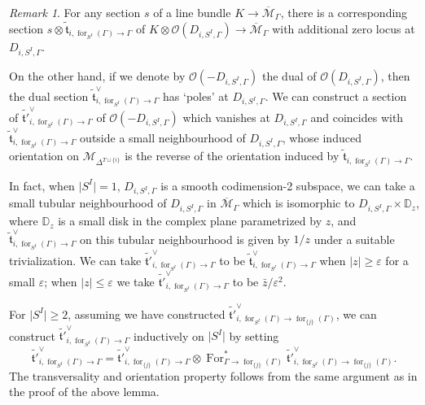 \documentclass[11pt]{amsart}
\theoremstyle{definition}
\theoremstyle{remark}
\newtheorem{rmk}[dummy]{Remark}
\renewcommand{\for}{\operatorname{for}}
\newcommand{\For}{\operatorname{For}}
\newcommand{\<}{\left<}
\renewcommand{\>}{\right>}
\numberwithin{equation}{section}
\def\Mbar{{\overline{\mathcal M}}}
\begin{document}
\begin{rmk}\label{rmk divosr like section}
    For any section $s$ of a line bundle $K\to \Mbar_{\Gamma}$, there is a corresponding section $s \otimes \tilde{\mathfrak t }_{i,\for_{S^I}(\Gamma)\to\Gamma}$ of $K\otimes \mathcal O(D_{i,S^I,\Gamma})\to \Mbar_{\Gamma}$ with additional zero locus at $D_{i,S^I,\Gamma}$.

    On the other hand, if we denote by $\mathcal O(-D_{i,S^I,\Gamma})$ the dual of $\mathcal O(D_{i,S^I,\Gamma})$, then the dual section $\tilde{\mathfrak t }_{i,\for_{S^I}(\Gamma)\to\Gamma}^\vee$ has `poles' at $D_{i,S^I,\Gamma}$. We can construct a section of $\tilde{\mathfrak t' }_{i,\for_{S^I}(\Gamma)\to\Gamma}^\vee$ of $\mathcal O(-D_{i,S^I,\Gamma})$ which vanishes at $D_{i,S^I,\Gamma}$ and coincides with $\tilde{\mathfrak t }_{i,\for_{S^I}(\Gamma)\to\Gamma}^\vee$ outside a small neighbourhood of $D_{i,S^I,\Gamma}$, whose induced orientation on $\mathcal M_{\Delta^{T\sqcup\{i\}}}$ is the reverse of the orientation induced by $\tilde{\mathfrak t }_{i,\for_{S^I}(\Gamma)\to\Gamma}$. 
    
    In fact, when $\lvert S^I\rvert=1$, $D_{i,S^I,\Gamma}$ is a smooth codimension-2 subspace, we can take a small tubular neighbourhood of $D_{i,S^I,\Gamma}$ in $\Mbar_\Gamma$ which is isomorphic to $D_{i,S^I,\Gamma}\times \mathbb D_z$, where $\mathbb D_z$ is a small disk in the complex plane parametrized by $z$, and $\tilde{\mathfrak t }_{i,\for_{S^I}(\Gamma)\to\Gamma}^\vee$ on this tubular neighbourhood is given by $1/z$ under a suitable trivialization. We can take $\tilde{\mathfrak t' }_{i,\for_{S^I}(\Gamma)\to\Gamma}^\vee$ to be $\tilde{\mathfrak t }_{i,\for_{S^I}(\Gamma)\to\Gamma}^\vee$ when $\lvert z\rvert\ge \varepsilon$ for a small $\varepsilon$; when $\lvert z\rvert\le \varepsilon$ we take $\tilde{\mathfrak t' }_{i,\for_{S^I}(\Gamma)\to\Gamma}^\vee$ to be $\bar z/\varepsilon^2$.
    
    For $\lvert S^I\rvert\ge 2$,  assuming we have constructed $\tilde{\mathfrak t'}_{i,\for_{S^I}(\Gamma)\to\for_{\{j\}}(\Gamma)}^\vee$, we can construct $\tilde{\mathfrak t' }_{i,\for_{S^I}(\Gamma)\to\Gamma}^\vee$ inductively on $\lvert S^I\rvert$ by setting
    $$\tilde{\mathfrak t'}_{i,\for_{S^I}(\Gamma)\to\Gamma}^\vee= \tilde{\mathfrak t'}_{i,\for_{\{j\}}(\Gamma)\to\Gamma}^\vee\otimes  \For_{\Gamma\to \for_{\{j\}}(\Gamma)}^* \tilde{\mathfrak t'}_{i,\for_{S^I}(\Gamma)\to\for_{\{j\}}(\Gamma)}^\vee.$$ 
    The transversality and orientation property follows from the same argument as in the proof of the above lemma.
\end{rmk}
\end{document}
